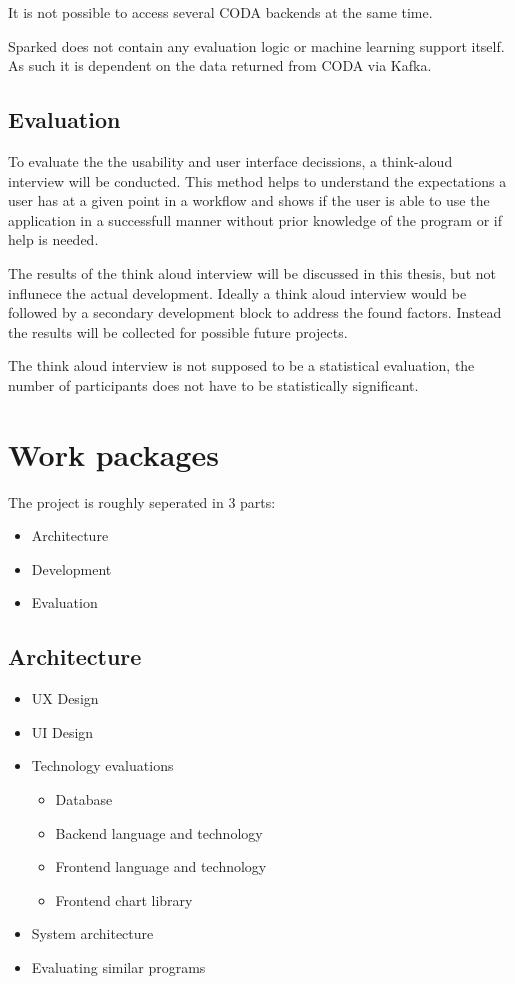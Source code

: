 \documentclass[12pt,a4paper,titlepage,oneside,BCOR1cm]{scrreprt}
\begin{document}
It is not possible to access several CODA backends at the same time. 

Sparked does not contain any evaluation logic or machine learning support itself. As such it is dependent on the data returned from CODA via Kafka.

\section{Evaluation}

To evaluate the the usability and user interface decissions, a think-aloud interview will be conducted. This method helps to understand the expectations a user has at a given point in a workflow and shows if the user is able to use the application in a successfull manner without prior knowledge of the program or if help is needed.

The results of the think aloud interview will be discussed in this thesis, but not influnece the actual development. Ideally a think aloud interview would be followed by a secondary development block to address the found factors. Instead the results will be collected for possible future projects.

The think aloud interview is not supposed to be a statistical evaluation, the number of participants does not have to be statistically significant. 

\chapter{Work packages}

The project is roughly seperated in 3 parts:
\begin{itemize}
  \item Architecture
  \item Development
  \item Evaluation
\end{itemize}


\section{Architecture}
\begin{itemize}
  \item UX Design
  \item UI Design
  \item Technology evaluations
  
  \begin{itemize}
    \item Database
    \item Backend language and technology
    \item Frontend language and technology
    \item Frontend chart library
  \end{itemize}  
  \item System architecture
  \item Evaluating similar programs

\end{itemize}  
\end{document}
